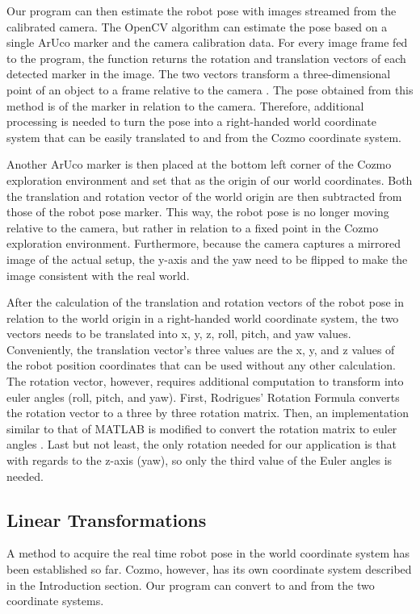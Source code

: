\documentclass[jou,apacite]{apa6}
\begin{document}
Our program can then estimate the robot pose with images streamed from the calibrated camera. The OpenCV algorithm can estimate the pose based on a single ArUco marker and the camera calibration data. For every image frame fed to the program, the function returns the rotation and translation vectors of each detected marker in the image. The two vectors transform a three-dimensional point of an object to a frame relative to the camera \cite{OpenCV}. The pose obtained from this method is of the marker in relation to the camera. Therefore, additional processing is needed to turn the pose into a right-handed world coordinate system that can be easily translated to and from the Cozmo coordinate system.

Another ArUco marker is then placed at the bottom left corner of the Cozmo exploration environment and set that as the origin of our world coordinates. Both the translation and rotation vector of the world origin are then subtracted from those of the robot pose marker. This way, the robot pose is no longer moving relative to the camera, but rather in relation to a fixed point in the Cozmo exploration environment. Furthermore, because the camera captures a mirrored image of the actual setup, the y-axis and the yaw need to be flipped to make the image consistent with the real world.

After the calculation of the translation and rotation vectors of the robot pose in relation to the world origin in a right-handed world coordinate system, the two vectors needs to be translated into x, y, z, roll, pitch, and yaw values. Conveniently, the translation vector’s three values are the x, y, and z values of the robot position coordinates that can be used without any other calculation. The rotation vector, however, requires additional computation to transform into euler angles (roll, pitch, and yaw). First, Rodrigues' Rotation Formula converts the rotation vector to a three by three rotation matrix. Then, an implementation similar to that of MATLAB is modified to convert the rotation matrix to euler angles \cite{Mallick}. Last but not least, the only rotation needed for our application is that with regards to the z-axis (yaw), so only the third value of the Euler angles is needed.


\subsection{Linear Transformations}
A method to acquire the real time robot pose in the world coordinate system has been established so far. Cozmo, however, has its own coordinate system described in the Introduction section. Our program can convert to and from the two coordinate systems.
\end{document}
